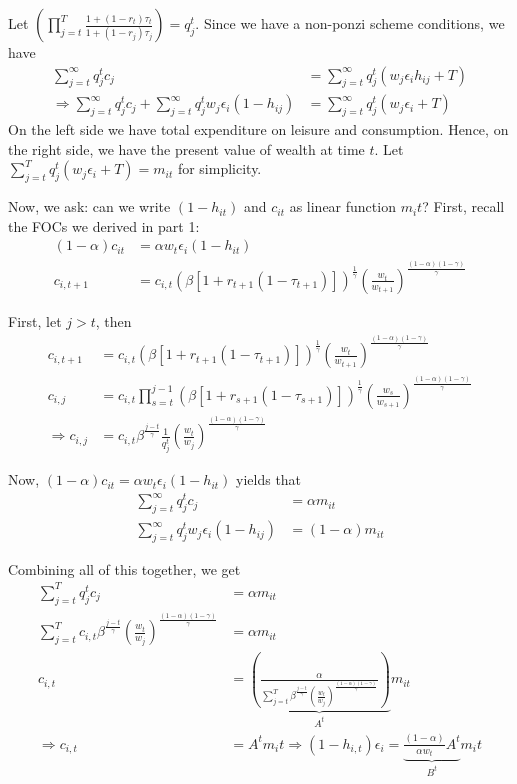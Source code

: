 \documentclass[12pt]{article}
\newcommand{\1}{{\bf 1}} %
\begin{document}
\begin{enumerate}[(1)]
	Let $\left(  \prod_{j=t}^{T}\frac{1+(1-r_t)\tau_t}{1+(1-r_j)\tau_j}\right) = q^t_j$. Since we have a non-ponzi scheme conditions, we have
\begin{align*}
	\sum_{j=t}^\infty q^t_j c_{j} &= \sum_{j=t}^\infty q^t_j (w_j\epsilon_ih_{ij}+T)\\
	\Rightarrow \sum_{j=t}^\infty q^t_j c_{j}+ \sum_{j=t}^\infty q^t_j w_j\epsilon_i(1-h_{ij}) &= \sum_{j=t}^\infty q^t_j (w_j\epsilon_i+T)
\end{align*}
On the left side we have total expenditure on leisure and consumption. Hence, on the right side, we have the present value of wealth at time $t$. Let $\sum_{j=t}^Tq^t_j (w_j\epsilon_i+T) = m_{it}$ for simplicity.

Now, we ask: can we write $(1-h_{it})$ and $c_{it}$ as linear function $m_it$? First, recall the FOCs we derived in part 1:
		\begin{align*}	(1-\alpha) c_{it}  &=  \alpha w_t \epsilon_i (1-h_{it})\\
c_{i,t+1} &= c_{i,t} \left( \beta [1+r_{t+1}(1-\tau_{t+1})]\right)^{\frac{1}{\gamma}}  \left( \frac{w_t}{w_{t+1}}\right) ^{\frac{(1-\alpha)(1-\gamma)}{\gamma}}
\end{align*}

First, let $j>t$, then 
	\begin{align*}	c_{i,t+1} &= c_{i,t} \left( \beta [1+r_{t+1}(1-\tau_{t+1})]\right)^{\frac{1}{\gamma}}  \left( \frac{w_t}{w_{t+1}}\right) ^{\frac{(1-\alpha)(1-\gamma)}{\gamma}}\\
c_{i,j} &= c_{i,t}  \prod_{s=t}^{j-1}\left( \beta [1+r_{s+1}(1-\tau_{s+1})]\right)^{\frac{1}{\gamma}} \left( \frac{w_s}{w_{s+1}}\right) ^{\frac{(1-\alpha)(1-\gamma)}{\gamma}}\\
\Rightarrow c_{i,j}&= c_{i,t}  \beta^{\frac{j-t}{\gamma}} \frac{1}{q_j^t} \left( \frac{w_t}{w_{j}}\right) ^{\frac{(1-\alpha)(1-\gamma)}{\gamma}}
\end{align*}


Now, $(1-\alpha) c_{it}  =  \alpha w_t \epsilon_i (1-h_{it})$ yields that
\begin{align*}
\sum_{j=t}^\infty q^t_j c_{j} &= \alpha m_{it}\\
\sum_{j=t}^\infty  q^t_j w_j\epsilon_i(1-h_{ij}) &= (1-\alpha)m_{it}
\end{align*}

Combining all of this together, we get
	\begin{align*}
	\sum_{j=t}^Tq^t_j c_{j} &= \alpha m_{it}\\
	\sum_{j=t}^T c_{i,t}  \beta^{\frac{j-t}{\gamma}} \left( \frac{w_t}{w_{j}}\right) ^{\frac{(1-\alpha)(1-\gamma)}{\gamma}} &= \alpha m_{it}\\
	c_{i,t} &= \underbrace{\left( \frac{\alpha}{\sum_{j=t}^T   \beta^{\frac{j-t}{\gamma}} \left( \frac{w_t}{w_{j}}\right)^{\frac{(1-\alpha)(1-\gamma)}{\gamma}}}\right) }_{A^t} m_{it}\\
	\Rightarrow c_{i,t}& = A^t m_it
	\Rightarrow (1-h_{i,t})\epsilon_i = \underbrace{\frac{(1-\alpha)}{\alpha w_t } A^t}_{B^{t}} m_it
	\end{align*}
	

\end{enumerate}
\end{document}
